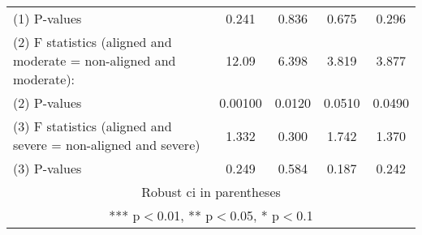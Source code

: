 \begin{tabular}{lcccc}
(1) \hspace{1mm} P-values & 0.241 & 0.836 & 0.675 & 0.296 \\
(2) F statistics (aligned and moderate = non-aligned and moderate): & 12.09 & 6.398 & 3.819 & 3.877 \\
(2) \hspace{1mm} P-values & 0.00100 & 0.0120 & 0.0510 & 0.0490 \\
(3) F statistics (aligned and severe = non-aligned and severe) & 1.332 & 0.300 & 1.742 & 1.370 \\
 (3) \hspace{1mm} P-values & 0.249 & 0.584 & 0.187 & 0.242 \\ \hline
\multicolumn{5}{c}{ Robust ci in parentheses} \\
\multicolumn{5}{c}{ *** p$<$0.01, ** p$<$0.05, * p$<$0.1} \\
\end{tabular}
